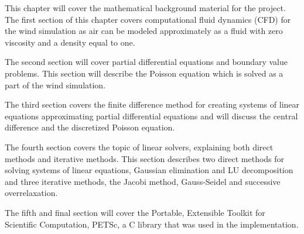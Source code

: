 This chapter will cover the mathematical background material for the project. 
The first section of this chapter covers computational fluid dynamics (CFD) 
for the wind simulation as air can be modeled approximately as a fluid with 
zero viscosity and a density equal to one\cite{originalSnowThesis}.

The second section will cover partial differential equations and boundary value
problems. This section will describe the Poisson equation which is solved as a 
part of the wind simulation.

The third section covers the finite difference method for creating systems of
linear equations approximating partial differential equations and will discuss
the central difference and the discretized Poisson equation.

The fourth section covers the topic of linear solvers, explaining both direct
methods and iterative methods. This section describes two direct
methods for solving systems of linear equations, Gaussian elimination and LU
decomposition and three iterative methods, the Jacobi method, Gauss-Seidel and
successive overrelaxation.

The fifth and final section will cover the Portable, Extensible Toolkit for
Scientific Computation, PETSc, a C library that was used in the implementation.

